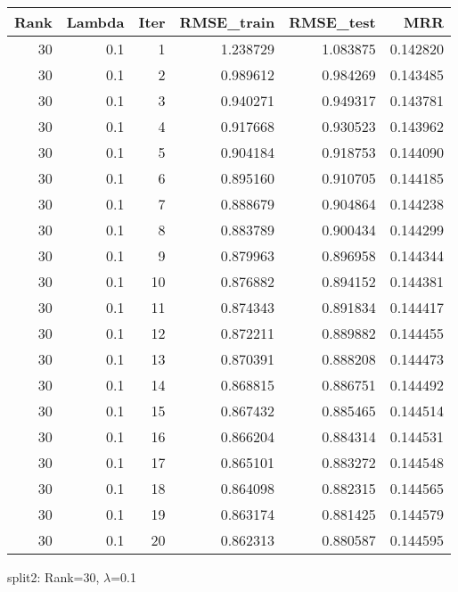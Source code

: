 \begin{tabular}{rrrrrr}
\toprule
 Rank &  Lambda &  Iter &  RMSE\_train &  RMSE\_test &       MRR \\
\midrule
   30 &     0.1 &     1 &    1.238729 &   1.083875 &  0.142820 \\
   30 &     0.1 &     2 &    0.989612 &   0.984269 &  0.143485 \\
   30 &     0.1 &     3 &    0.940271 &   0.949317 &  0.143781 \\
   30 &     0.1 &     4 &    0.917668 &   0.930523 &  0.143962 \\
   30 &     0.1 &     5 &    0.904184 &   0.918753 &  0.144090 \\
   30 &     0.1 &     6 &    0.895160 &   0.910705 &  0.144185 \\
   30 &     0.1 &     7 &    0.888679 &   0.904864 &  0.144238 \\
   30 &     0.1 &     8 &    0.883789 &   0.900434 &  0.144299 \\
   30 &     0.1 &     9 &    0.879963 &   0.896958 &  0.144344 \\
   30 &     0.1 &    10 &    0.876882 &   0.894152 &  0.144381 \\
   30 &     0.1 &    11 &    0.874343 &   0.891834 &  0.144417 \\
   30 &     0.1 &    12 &    0.872211 &   0.889882 &  0.144455 \\
   30 &     0.1 &    13 &    0.870391 &   0.888208 &  0.144473 \\
   30 &     0.1 &    14 &    0.868815 &   0.886751 &  0.144492 \\
   30 &     0.1 &    15 &    0.867432 &   0.885465 &  0.144514 \\
   30 &     0.1 &    16 &    0.866204 &   0.884314 &  0.144531 \\
   30 &     0.1 &    17 &    0.865101 &   0.883272 &  0.144548 \\
   30 &     0.1 &    18 &    0.864098 &   0.882315 &  0.144565 \\
   30 &     0.1 &    19 &    0.863174 &   0.881425 &  0.144579 \\
   30 &     0.1 &    20 &    0.862313 &   0.880587 &  0.144595 \\
\bottomrule
\end{tabular}

\caption{split2: Rank=30, $\lambda$=0.1}
